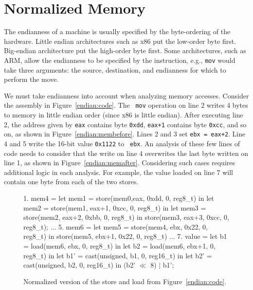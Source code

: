 \section{Normalized Memory} 
\label{vine:normalized}

The endianness of a machine is usually specified by the byte-ordering
of the hardware.  Little endian architectures such as x86 put the
low-order byte first. Big-endian architecture put the high-order byte
first. Some architectures, such as ARM, allow the endianness to be
specified by the instruction, e.g., {\tt mov} would take three
arguments: the source, destination, and endianness for which to
perform the move.


We must take endianness into account when analyzing memory
accesses. Consider the assembly in Figure~\ref{endian:code}. The {\tt
  mov} operation on line 2 writes 4 bytes to memory in little endian
order (since x86 is little endian). After executing line 2, the
address given by {\tt eax} contains byte {\tt 0xdd}, {\tt eax+1}
contains byte {\tt 0xcc}, and so on, as shown in
Figure~\ref{endian:membefore}. Lines 2 and 3 set {\tt ebx =
  eax+2}. Line 4 and 5 write the 16-bit value {\tt 0x1122} to {\tt
  ebx}.  An analysis of these few lines of code needs to consider that
the write on line 4 overwrites the last byte written on line 1, as
shown in Figure~\ref{endian:memafter}. Considering such cases requires
additional logic in each analysis. For example, the value loaded on
line 7 will contain one byte from each of the two stores.


\begin{figure}
\begin{footnotesize}
\begin{code}  
1. mem4 = let mem1 = store(mem0,eax, 0xdd, 0, reg8\_t) in 
           let mem2 = store(mem1, eax+1, 0xcc, 0, reg8\_t) in 
           let mem3 = store(mem2, eax+2, 0xbb, 0, reg8\_t) in 
               store(mem3, eax+3, 0xcc, 0, reg8\_t);
...
5. mem6 = let mem5 = store(mem4, ebx, 0x22, 0, reg8\_t) in 
             store(mem5, ebx+1, 0x22, 0, reg8\_t) 
...
7. value = let b1 = load(mem6, ebx, 0, reg8\_t) in
            let b2 = load(mem6, ebx+1, 0, reg8\_t) in 
            let b1' = cast(unsigned, b1, 0, reg16\_t) in 
            let b2' = cast(unsigned, b2, 0, reg16\_t) in 
               (b2' $\ll$ 8) $|$ b1';
\end{code}
\end{footnotesize}
\caption{Normalized version of the store and load from Figure~\ref{endian:code}.}
\label{endian:normalized}
\end{figure}


